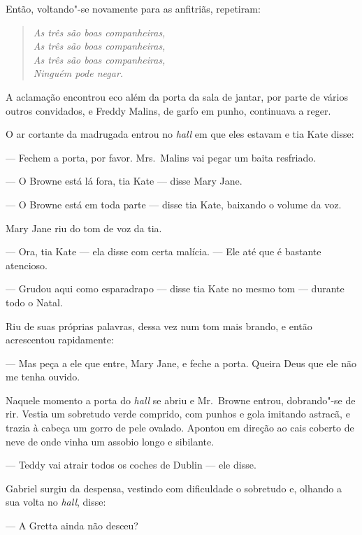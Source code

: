 Então, voltando"-se novamente para as anfitriãs, repetiram:

\begin{verse}\itshape
As três são boas companheiras,\\
As três são boas companheiras,\\%
As três são boas companheiras,\\
Ninguém pode negar.
\end{verse}

A aclamação encontrou eco além da porta da sala de jantar, por parte de vários
outros convidados, e Freddy Malins, de garfo em punho, continuava a reger.

\smallskip

\noindent\dotfill

\smallskip

O ar cortante da madrugada entrou no \textit{hall} em que eles estavam e tia
Kate disse:

--- Fechem a porta, por favor.  Mrs.~Malins vai pegar um baita resfriado.

--- O Browne está lá fora, tia Kate --- disse Mary Jane.

--- O Browne está em toda parte --- disse tia Kate, baixando o volume da voz.

Mary Jane riu do tom de voz da tia.

--- Ora, tia Kate --- ela disse com certa malícia.  --- Ele até que é bastante
atencioso.

--- Grudou aqui como esparadrapo --- disse tia Kate no mesmo tom --- durante
todo o Natal.

Riu de suas próprias palavras, dessa vez num tom mais brando, e então
acrescentou rapidamente:

--- Mas peça a ele que entre, Mary Jane, e feche a porta.  Queira Deus que ele
não me tenha ouvido.

Naquele momento a porta do \textit{hall} se abriu e Mr.~Browne entrou,
dobrando"-se de rir.  Vestia um sobretudo verde comprido, com punhos e gola
imitando astracã, e trazia à cabeça um gorro de pele ovalado.  Apontou em
direção ao cais coberto de neve de onde vinha um assobio longo e sibilante.

--- Teddy vai atrair todos os coches de Dublin --- ele disse.

Gabriel surgiu da despensa, vestindo com dificuldade o sobretudo e, olhando a
sua volta no \textit{hall}, disse:

--- A Gretta ainda não desceu?

